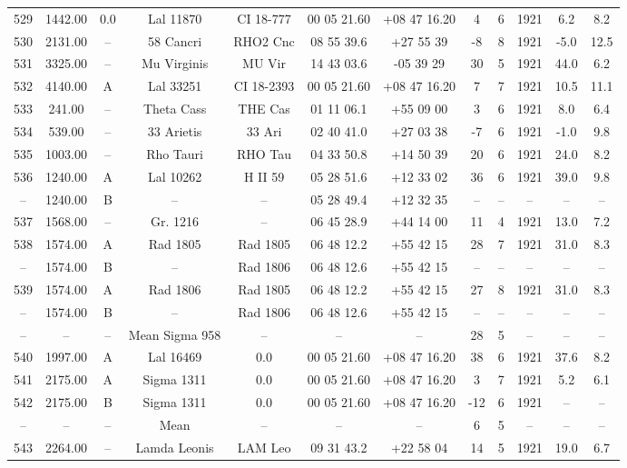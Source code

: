 \begin{table}
\begin{tabular}{cccccccccccc}
529 & 1442.00 & 0.0 & Lal 11870 & CI 18-777 & 00 05 21.60 & +08 47 16.20 & 4 & 6 & 1921 & 6.2 & 8.2 \\
530 & 2131.00 & -- & 58 Cancri & RHO2 Cnc & 08 55 39.6 & +27 55 39 & -8 & 8 & 1921 & -5.0 & 12.5 \\
531 & 3325.00 & -- & Mu Virginis & MU Vir & 14 43 03.6 & -05 39 29 & 30 & 5 & 1921 & 44.0 & 6.2 \\
532 & 4140.00 & A & Lal 33251 & CI 18-2393 & 00 05 21.60 & +08 47 16.20 & 7 & 7 & 1921 & 10.5 & 11.1 \\
533 & 241.00 & -- & Theta Cass & THE Cas & 01 11 06.1 & +55 09 00 & 3 & 6 & 1921 & 8.0 & 6.4 \\
534 & 539.00 & -- & 33 Arietis & 33 Ari & 02 40 41.0 & +27 03 38 & -7 & 6 & 1921 & -1.0 & 9.8 \\
535 & 1003.00 & -- & Rho Tauri & RHO Tau & 04 33 50.8 & +14 50 39 & 20 & 6 & 1921 & 24.0 & 8.2 \\
536 & 1240.00 & A & Lal 10262 & H II 59 & 05 28 51.6 & +12 33 02 & 36 & 6 & 1921 & 39.0 & 9.8 \\
-- & 1240.00 & B & -- & -- & 05 28 49.4 & +12 32 35 & -- & -- & -- & -- & -- \\
537 & 1568.00 & -- & Gr. 1216 & -- & 06 45 28.9 & +44 14 00 & 11 & 4 & 1921 & 13.0 & 7.2 \\
538 & 1574.00 & A & Rad 1805 & Rad 1805 & 06 48 12.2 & +55 42 15 & 28 & 7 & 1921 & 31.0 & 8.3 \\
-- & 1574.00 & B & -- & Rad 1806 & 06 48 12.6 & +55 42 15 & -- & -- & -- & -- & -- \\
539 & 1574.00 & A & Rad 1806 & Rad 1805 & 06 48 12.2 & +55 42 15 & 27 & 8 & 1921 & 31.0 & 8.3 \\
-- & 1574.00 & B & -- & Rad 1806 & 06 48 12.6 & +55 42 15 & -- & -- & -- & -- & -- \\
-- & -- & -- & Mean Sigma 958 & -- & -- & -- & 28 & 5 & -- & -- & -- \\
540 & 1997.00 & A & Lal 16469 & 0.0 & 00 05 21.60 & +08 47 16.20 & 38 & 6 & 1921 & 37.6 & 8.2 \\
541 & 2175.00 & A & Sigma 1311 & 0.0 & 00 05 21.60 & +08 47 16.20 & 3 & 7 & 1921 & 5.2 & 6.1 \\
542 & 2175.00 & B & Sigma 1311 & 0.0 & 00 05 21.60 & +08 47 16.20 & -12 & 6 & 1921 & -- & -- \\
-- & -- & -- & Mean & -- & -- & -- & 6 & 5 & -- & -- & -- \\
543 & 2264.00 & -- & Lamda Leonis & LAM Leo & 09 31 43.2 & +22 58 04 & 14 & 5 & 1921 & 19.0 & 6.7 \\

\end{tabular}
\end{table}
